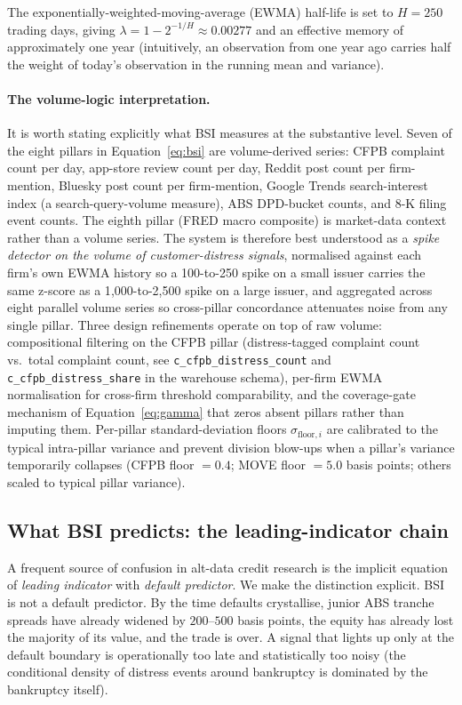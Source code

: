 \documentclass[11pt,a4paper]{article}
\begin{document}
The exponentially-weighted-moving-average (EWMA) half-life is set to $H = 250$ trading days, giving $\lambda = 1 - 2^{-1/H} \approx 0.00277$ and an effective memory of approximately one year (intuitively, an observation from one year ago carries half the weight of today's observation in the running mean and variance).

\paragraph{The volume-logic interpretation.} It is worth stating explicitly what BSI measures at the substantive level. Seven of the eight pillars in Equation~\ref{eq:bsi} are volume-derived series: CFPB complaint count per day, app-store review count per day, Reddit post count per firm-mention, Bluesky post count per firm-mention, Google Trends search-interest index (a search-query-volume measure), ABS DPD-bucket counts, and 8-K filing event counts. The eighth pillar (FRED macro composite) is market-data context rather than a volume series. The system is therefore best understood as a \emph{spike detector on the volume of customer-distress signals}, normalised against each firm's own EWMA history so a 100-to-250 spike on a small issuer carries the same z-score as a 1{,}000-to-2{,}500 spike on a large issuer, and aggregated across eight parallel volume series so cross-pillar concordance attenuates noise from any single pillar. Three design refinements operate on top of raw volume: compositional filtering on the CFPB pillar (distress-tagged complaint count vs.\ total complaint count, see \texttt{c\_cfpb\_distress\_count} and \texttt{c\_cfpb\_distress\_share} in the warehouse schema), per-firm EWMA normalisation for cross-firm threshold comparability, and the coverage-gate mechanism of Equation~\ref{eq:gamma} that zeros absent pillars rather than imputing them. Per-pillar standard-deviation floors $\sigma_{\text{floor},i}$ are calibrated to the typical intra-pillar variance and prevent division blow-ups when a pillar's variance temporarily collapses (CFPB floor $= 0.4$; MOVE floor $= 5.0$ basis points; others scaled to typical pillar variance).

\subsection{What BSI predicts: the leading-indicator chain}\label{sec:bsi_predicts}

A frequent source of confusion in alt-data credit research is the implicit equation of \emph{leading indicator} with \emph{default predictor}. We make the distinction explicit. BSI is not a default predictor. By the time defaults crystallise, junior ABS tranche spreads have already widened by $200$--$500$ basis points, the equity has already lost the majority of its value, and the trade is over. A signal that lights up only at the default boundary is operationally too late and statistically too noisy (the conditional density of distress events around bankruptcy is dominated by the bankruptcy itself).
\end{document}
